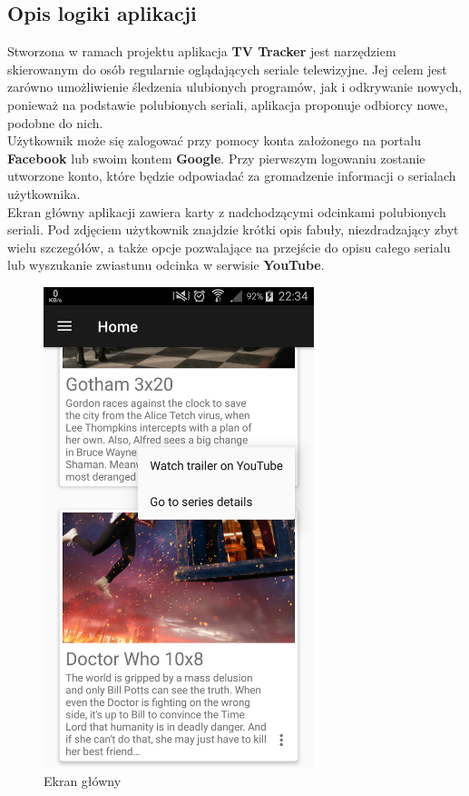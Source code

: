 \documentclass[10pt,a4paper]{article}
\begin{document}
\subsection{Opis logiki aplikacji}
Stworzona w ramach projektu aplikacja \textbf{TV Tracker} jest narzędziem skierowanym do osób regularnie oglądających seriale telewizyjne. Jej celem jest zarówno umożliwienie śledzenia ulubionych programów, jak i odkrywanie nowych, ponieważ na podstawie polubionych seriali, aplikacja proponuje odbiorcy nowe, podobne do nich.\\[\baselineskip]
Użytkownik może się zalogować przy pomocy konta założonego na portalu \textbf{Facebook} lub swoim kontem \textbf{Google}. Przy pierwszym logowaniu zostanie utworzone konto, które będzie odpowiadać za gromadzenie informacji o serialach użytkownika.\\[\baselineskip]
Ekran główny aplikacji zawiera karty z nadchodzącymi odcinkami polubionych seriali. Pod zdjęciem użytkownik znajdzie krótki opis fabuły, niezdradzający zbyt wielu szczegółów, a także opcje pozwalające na przejście do opisu całego serialu lub wyszukanie zwiastunu odcinka w serwisie \textbf{YouTube}.
\begin{figure}[H]
	\centering
	\includegraphics[height=14cm]{Resources/Images/home.png}
	\caption{Ekran główny}
\end{figure}
\end{document}
